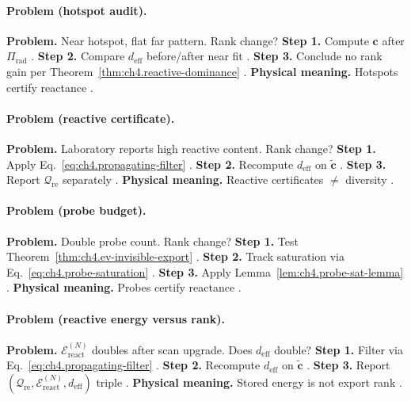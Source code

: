 \paragraph{Problem (hotspot audit).}
\textbf{Problem.} Near hotspot, flat far pattern. Rank change?
\textbf{Step 1.} Compute \(\mathbf{c}\) after \(\Pi_{\mathrm{rad}}\) \cite{stratton1941}.
\textbf{Step 2.} Compare \(d_{\mathrm{eff}}\) before/after near fit \cite{hansen1988,harrington2001}.
\textbf{Step 3.} Conclude no rank gain per Theorem~\ref{thm:ch4.reactive-dominance} \cite{devaney2004}.
\textbf{Physical meaning.} Hotspots certify reactance \cite{harrington2001}.

\paragraph{Problem (reactive certificate).}
\textbf{Problem.} Laboratory reports high reactive content. Rank change?
\textbf{Step 1.} Apply Eq.~\eqref{eq:ch4.propagating-filter} \cite{stratton1941,harrington2001}.
\textbf{Step 2.} Recompute \(d_{\mathrm{eff}}\) on \(\widetilde{\mathbf{c}}\) \cite{hansen1988,devaney2004}.
\textbf{Step 3.} Report \(\mathcal{Q}_{\mathrm{re}}\) separately \cite{harrington2001,jackson1999}.
\textbf{Physical meaning.} Reactive certificates \(\neq\) diversity \cite{stratton1941}.

\paragraph{Problem (probe budget).}
\textbf{Problem.} Double probe count. Rank change?
\textbf{Step 1.} Test Theorem~\ref{thm:ch4.ev-invisible-export} \cite{stratton1941,harrington2001}.
\textbf{Step 2.} Track saturation via Eq.~\eqref{eq:ch4.probe-saturation} \cite{devaney2004}.
\textbf{Step 3.} Apply Lemma~\ref{lem:ch4.probe-sat-lemma} \cite{hansen1988}.
\textbf{Physical meaning.} Probes certify reactance \cite{stratton1941}.

\paragraph{Problem (reactive energy versus rank).}
\textbf{Problem.} \(\mathcal{E}_{\mathrm{react}}^{(N)}\) doubles after scan upgrade. Does \(d_{\mathrm{eff}}\) double?
\textbf{Step 1.} Filter via Eq.~\eqref{eq:ch4.propagating-filter} \cite{stratton1941,harrington2001}.
\textbf{Step 2.} Recompute \(d_{\mathrm{eff}}\) on \(\widetilde{\mathbf{c}}\) \cite{hansen1988,devaney2004}.
\textbf{Step 3.} Report \((\mathcal{Q}_{\mathrm{re}},\mathcal{E}_{\mathrm{react}}^{(N)},d_{\mathrm{eff}})\) triple \cite{jackson1999}.
\textbf{Physical meaning.} Stored energy is not export rank \cite{stratton1941}.

